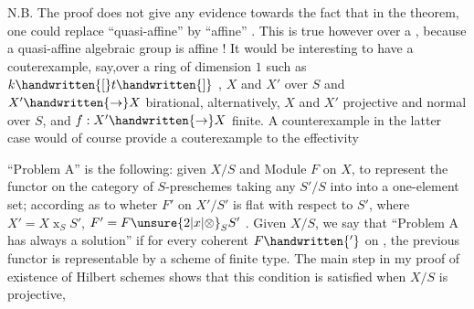 N.B. The proof does not give any evidence towards the fact that in the theorem, one could replace ``quasi-affine'' by ``affine'' . This is true however over a , because a quasi-affine algebraic group is affine ! It would be interesting to have a couterexample, say,over a  ring of dimension $1$ such as $k\handwritten{[}t\handwritten{]}$ , $X$ and $X'$
\reversemarginpar
{}
\normalmarginpar
\noindent over $S$ and $X'\handwritten{\to}X$ birational, alternatively,  $X$ and $X'$ projective and normal over $S$, and $f:X'\handwritten{\to}X$ finite. A counterexample in the latter case would of course provide a couterexample to the effectivity

``Problem A'' is the following: given $X/S$ and  Module $F$ on $X$, to represent the functor on the category of $S$-preschemes taking any $S'/S$ into  into a one-element  set; according as to wheter $F'$ on $X'/S'$ is flat with respect to $S'$, where $X'=X\mathbin{x}_S S'$, $F'=F\unsure{2|x|\otimes}_S S'$ . Given $X/S$, we say that ``Problem A  has always a solution'' if for every coherent $F\handwritten{'}$ on , the previous functor  is representable by a scheme of finite type. The main step in my proof of existence of Hilbert schemes shows that this condition is satisfied when $X/S$ is projective,

